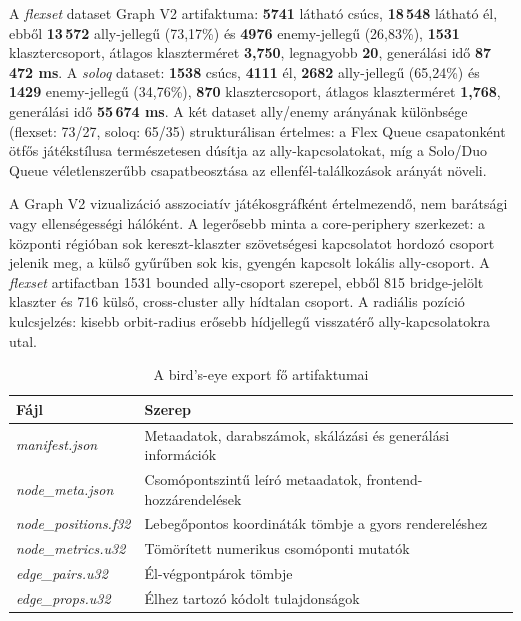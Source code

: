 A \textit{flexset} dataset Graph V2 artifaktuma: \textbf{5741} látható csúcs, \textbf{18\,548} látható él, ebből \textbf{13\,572} ally-jellegű (73,17\%) és \textbf{4976} enemy-jellegű (26,83\%), \textbf{1531} klasztercsoport, átlagos klaszterméret \textbf{3,750}, legnagyobb \textbf{20}, generálási idő \textbf{87\,472 ms}. A \textit{soloq} dataset: \textbf{1538} csúcs, \textbf{4111} él, \textbf{2682} ally-jellegű (65,24\%) és \textbf{1429} enemy-jellegű (34,76\%), \textbf{870} klasztercsoport, átlagos klaszterméret \textbf{1,768}, generálási idő \textbf{55\,674 ms}. A két dataset ally/enemy arányának különbsége (flexset: 73/27, soloq: 65/35) strukturálisan értelmes: a Flex Queue csapatonként ötfős játékstílusa természetesen dúsítja az ally-kapcsolatokat, míg a Solo/Duo Queue véletlenszerűbb csapatbeosztása az ellenfél-találkozások arányát növeli.

A Graph V2 vizualizáció asszociatív játékosgráfként értelmezendő, nem barátsági vagy ellenségességi hálóként. A legerősebb minta a core-periphery szerkezet: a központi régióban sok kereszt-klaszter szövetségesi kapcsolatot hordozó csoport jelenik meg, a külső gyűrűben sok kis, gyengén kapcsolt lokális ally-csoport. A \textit{flexset} artifactban 1531 bounded ally-csoport szerepel, ebből 815 bridge-jelölt klaszter és 716 külső, cross-cluster ally hídtalan csoport. A radiális pozíció kulcsjelzés: kisebb orbit-radius erősebb hídjellegű visszatérő ally-kapcsolatokra utal.

\begin{table}[H]
\centering
\caption{A bird's-eye export fő artifaktumai}
\begin{tabularx}{\textwidth}{>{\raggedright\arraybackslash}p{4.2cm}X}
\toprule
\textbf{Fájl} & \textbf{Szerep} \\
\midrule
\textit{manifest.json} & Metaadatok, darabszámok, skálázási és generálási információk \\
\textit{node\_meta.json} & Csomópontszintű leíró metaadatok, frontend-hozzárendelések \\
\textit{node\_positions.f32} & Lebegőpontos koordináták tömbje a gyors rendereléshez \\
\textit{node\_metrics.u32} & Tömörített numerikus csomóponti mutatók \\
\textit{edge\_pairs.u32} & Él-végpontpárok tömbje \\
\textit{edge\_props.u32} & Élhez tartozó kódolt tulajdonságok \\
\bottomrule
\end{tabularx}
\end{table}

